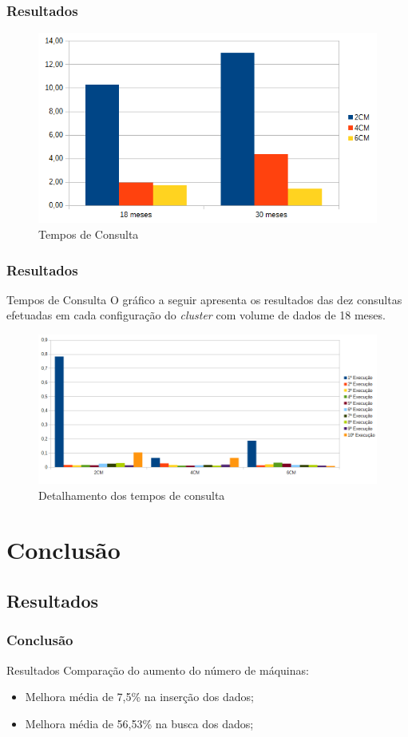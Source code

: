 \documentclass[brazil]{beamer}
\begin{document}
\begin{frame}
	\frametitle{Resultados}
	
	\begin{figure}
		\includegraphics[width=0.7\linewidth]{figuras/graphselect.png}
		\caption{Tempos de Consulta}
	\end{figure}
\end{frame}

\begin{frame}
	\frametitle{Resultados}
	
	\begin{block}{Tempos de Consulta}
	O gráfico a seguir apresenta os resultados das dez consultas efetuadas em cada configuração do \emph{cluster} com volume de dados de 18 meses.
	
	\begin{figure}
		\includegraphics[width=0.7\linewidth]{figuras/graphselect_detail.png}
		\caption{Detalhamento dos tempos de consulta}
	\end{figure}
	\end{block}
\end{frame}

\section{Conclusão}
\subsection{Resultados}
\begin{frame}
\frametitle{Conclusão}
	\begin{block}{Resultados}
		Comparação do aumento do número de máquinas:
		\begin{itemize}
			\item Melhora média de 7,5\% na inserção dos dados;
			\item Melhora média de 56,53\% na busca dos dados;
		\end{itemize}
	\end{block}
\end{frame}
\end{document}

